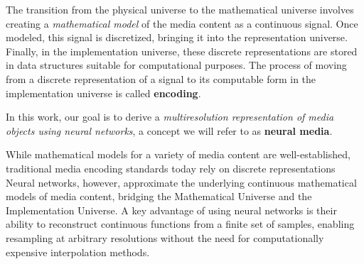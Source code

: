 The transition from the physical universe to the mathematical universe involves creating a \textit{mathematical model} of the media content as a continuous signal. Once modeled, this signal is discretized, bringing it into the representation universe. Finally, in the implementation universe, these discrete representations are stored in data structures suitable for computational purposes. The process of moving from a discrete representation of a signal to its computable form in the implementation universe is called \textbf{encoding}. 


In this work, our goal is to derive a \textit{multiresolution representation of media objects using neural networks}, a concept we will refer to as \textbf{neural media}. 


While mathematical models for a variety of media content are well-established, traditional media encoding standards today rely on discrete representations
Neural networks, however, approximate the underlying continuous mathematical models of media content, bridging the Mathematical Universe and the Implementation Universe. A key advantage of using neural networks is their ability to reconstruct continuous functions from a finite set of samples, enabling resampling at arbitrary resolutions without the need for computationally expensive interpolation methods.


